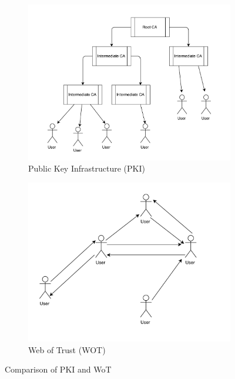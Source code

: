 \begin{figure}
	\centering
	\begin{subfigure}{.5\textwidth}
		\centering
		\includegraphics[width=1\linewidth]{figures/PKI}
		\caption{Public Key Infrastructure (PKI)}
		\label{fig:pki}
	\end{subfigure}%
	\begin{subfigure}{.5\textwidth}
		\centering
		\includegraphics[width=1\linewidth]{figures/WOT}
		\caption{Web of Trust (WOT)}
		\label{fig:wot}
	\end{subfigure}
	\caption{Comparison of PKI and WoT}
	\label{fig:pkiwot}
\end{figure}



